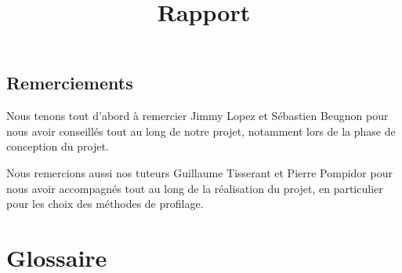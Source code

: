 \documentclass{report}
\title{Rapport}
\author{}
\date{}
\begin{document}
\maketitle

\tableofcontents



\newpage

\section*{Remerciements}
	Nous tenons tout d'abord à remercier Jimmy Lopez et Sébastien Beugnon pour nous avoir conseillés tout au long de notre projet, notamment lors de la phase de conception du projet.
	
	
	Nous remercions aussi nos tuteurs Guillaume Tisserant et Pierre Pompidor pour nous avoir accompagnés tout au long de la réalisation du projet, en particulier pour les choix des méthodes de profilage.

\newpage

\chapter*{Glossaire}
\end{document}
